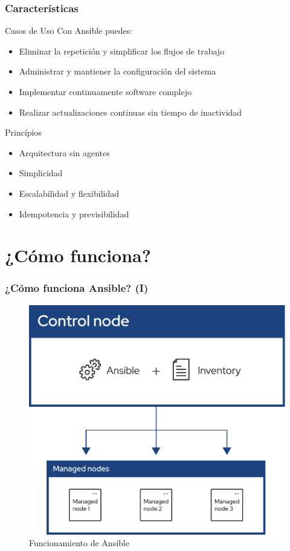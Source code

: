 \documentclass[
	11pt, %
]{beamer}
\begin{document}

\begin{frame}
	\frametitle{Características}

	\begin{exampleblock}{Casos de Uso}
		Con Ansible puedes:
		\begin{itemize}
			\item Eliminar la repetición y simplificar los flujos de trabajo
			\item Administrar y mantiener la configuración del sistema
			\item Implementar continuamente software complejo
			\item Realizar actualizaciones continuas sin tiempo de inactividad
		\end{itemize}
	\end{exampleblock}

	\begin{exampleblock}{Princípios}
		\begin{itemize}
			\item Arquitectura sin agentes
			\item Simplicidad
			\item Escalabilidad y flexibilidad
			\item Idempotencia y previsibilidad
		\end{itemize}
	\end{exampleblock}

\end{frame}

\section{¿Cómo funciona?}

\begin{frame}
	\frametitle{¿Cómo funciona Ansible? (I)}

	\begin{figure}
		\includegraphics[width=0.65\linewidth]{ansible_inv_start.pdf}
		\caption{Funcionamiento de Ansible}
	\end{figure}

\end{frame}
\end{document}
